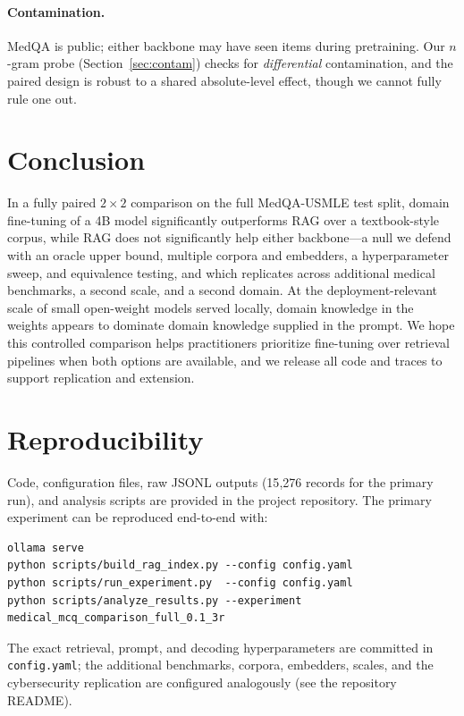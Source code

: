 \documentclass[11pt,a4paper]{article}
\begin{document}
\paragraph{Contamination.} MedQA is public; either backbone may have seen items
during pretraining. Our $n$-gram probe (Section~\ref{sec:contam}) checks for
\emph{differential} contamination, and the paired design is robust to a shared
absolute-level effect, though we cannot fully rule one out.

\section{Conclusion}

In a fully paired $2\!\times\!2$ comparison on the full MedQA-USMLE test split,
domain fine-tuning of a 4B model significantly outperforms RAG over a
textbook-style corpus, while RAG does not significantly help either backbone---a
null we defend with an oracle upper bound, multiple corpora and embedders, a
hyperparameter sweep, and equivalence testing, and which replicates across
additional medical benchmarks, a second scale, and a second domain. At the
deployment-relevant scale of small open-weight models served locally, domain
knowledge in the weights appears to dominate domain knowledge supplied in the
prompt. We hope this controlled comparison helps practitioners prioritize
fine-tuning over retrieval pipelines when both options are available, and we
release all code and traces to support replication and extension.

\section*{Reproducibility}

Code, configuration files, raw JSONL outputs (15{,}276 records for the primary
run), and analysis scripts are provided in the project repository. The primary
experiment can be reproduced end-to-end with:
\begin{verbatim}
ollama serve
python scripts/build_rag_index.py --config config.yaml
python scripts/run_experiment.py  --config config.yaml
python scripts/analyze_results.py --experiment medical_mcq_comparison_full_0.1_3r
\end{verbatim}
The exact retrieval, prompt, and decoding hyperparameters are committed in
\texttt{config.yaml}; the additional benchmarks, corpora, embedders, scales, and
the cybersecurity replication are configured analogously (see the repository
README).



\end{document}
